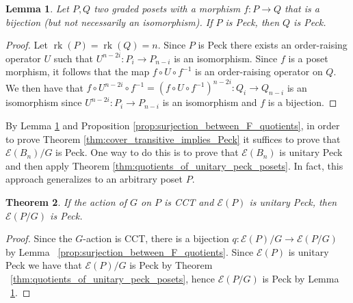 \documentclass[10 pt]{amsart}
\theoremstyle{plain}
\newtheorem{thm}{Theorem}[section]
\newtheorem{lem}[thm]{Lemma}
\theoremstyle{definition}
\theoremstyle{remark}
\numberwithin{equation}{section}
\newcommand\rk{\operatorname{rk}}
\begin{document}
\begin{lem}\label{lem:bijection_peck_implication}
Let $P,Q$ two graded posets with a morphism $f:P\rightarrow Q$ that is a bijection (but not necessarily an isomorphism). If $P$ is Peck, then $Q$ is Peck.
\end{lem}
\begin{proof}
Let $\rk(P) = \rk(Q) = n$.  Since $P$ is Peck there exists an order-raising operator $U$ such that $U^{n-2i}\colon P_i\rightarrow P_{n-i}$ is an isomorphism.  Since $f$ is a poset morphism, it follows that the map $f\circ U\circ f^{-1}$ is an order-raising operator on $Q$.  We then have that $f\circ U^{n-2i}\circ f^{-1} = \left(f\circ U\circ f^{-1}\right)^{n-2i}\colon Q_i\rightarrow Q_{n-i}$ is an isomorphism since $U^{n-2i}\colon P_i\rightarrow P_{n-i}$ is an isomorphism and $f$ is a bijection.

\end{proof}

By Lemma \ref{lem:bijection_peck_implication} and Proposition \ref{prop:surjection_between_F_quotients}, in order to prove Theorem \ref{thm:cover_transitive_implies_Peck} it suffices to prove that $\mathcal E(B_n)/G$ is Peck.  One way to do this is to prove that $\mathcal E(B_n)$ is unitary Peck and then apply Theorem \ref{thm:quotients_of_unitary_peck_posets}.  In fact, this approach generalizes to an arbitrary poset $P$.

\begin{thm}
If the action of $G$ on $P$ is CCT and $\mathcal E(P)$ is unitary Peck, then $\mathcal E(P/G)$ is Peck.
\end{thm}
\begin{proof}
Since the $G$-action is CCT, there is a bijection $q\colon\mathcal{E}(P)/G \rightarrow \mathcal{E}(P/G)$ by Lemma ~\ref{prop:surjection_between_F_quotients}.  Since $\mathcal{E}(P)$ is unitary Peck we have that $\mathcal{E}(P)/G$ is Peck by Theorem ~\ref{thm:quotients_of_unitary_peck_posets}, hence $\mathcal{E}(P/G)$ is Peck by Lemma ~\ref{lem:bijection_peck_implication}.
\end{proof}
\end{document}
